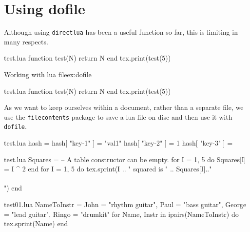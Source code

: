 \section{Using dofile}

Although using \lstinline{directlua} has been a useful function so far, this is limiting in many respects.
\begin{filecontents*}{test.lua}
 function test(N)
  return N
end
tex.print(test(5))
\end{filecontents*}

\begin{texexample}{Working with lua file}{ex:dofile}
\begin{filecontents*}{test.lua}
 function test(N)
   return N
 end
 tex.print(test(5))
\end{filecontents*}
\end{texexample}

As we want to keep ourselves within a document, rather than a separate file, we
use the \verb+filecontents+ package to save a lua file on disc and then use it with
\lstinline{dofile}.

\begin{tcblisting}{}
\begin{filecontents*}{test.lua}
hash = {}
hash[ "key-1" ] = "val1"
hash[ "key-2" ] = 1
hash[ "key-3" ] = {}
\end{filecontents*}
\end{tcblisting}


\begin{tcblisting}{}
\begin{filecontents*}{test.lua}
Squares = {} -- A table constructor can be empty.
 for I = 1, 5 do
   Squares[I] = I ^ 2
 end
 for I = 1, 5 do
   tex.sprint(I .. " squared is " .. Squares[I].."\\\\")
 end
\end{filecontents*}
\end{tcblisting}


\begin{tcblisting}{}
\begin{filecontents*}{test01.lua}
 NameToInstr = {John = "rhythm guitar",
 Paul = "bass guitar",
 George = "lead guitar",
 Ringo = "drumkit"}
 for Name, Instr in ipairs(NameToInstr) do
   tex.sprint(Name)
 end
\end{filecontents*}
\end{tcblisting}


